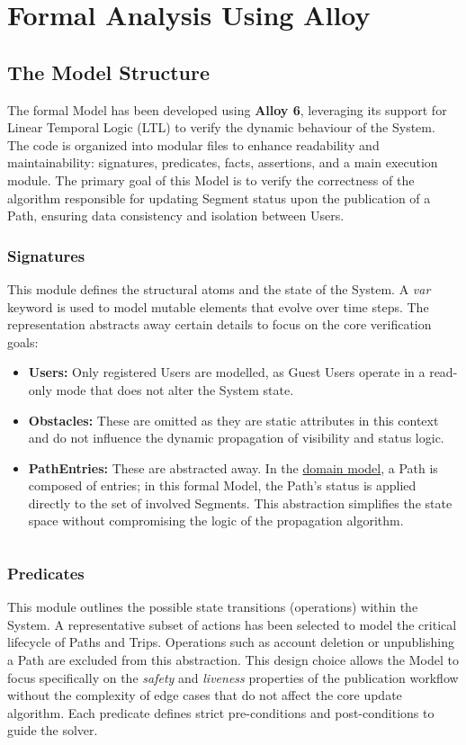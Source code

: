 \chapter{Formal Analysis Using Alloy}
\label{chap:alloy_analysis}

\section{The Model Structure}
The formal Model has been developed using \textbf{Alloy 6}, leveraging its support for Linear Temporal Logic (LTL) to verify the dynamic behaviour of the System. The code is organized into modular files to enhance readability and maintainability: signatures, predicates, facts, assertions, and a main execution module.
The primary goal of this Model is to verify the correctness of the algorithm responsible for updating Segment status upon the publication of a Path, ensuring data consistency and isolation between Users.

\subsection{Signatures}
This module defines the structural atoms and the state of the System. A \emph{var} keyword is used to model mutable elements that evolve over time steps.
The representation abstracts away certain details to focus on the core verification goals:
\begin{itemize}
    \item \textbf{Users:} Only registered Users are modelled, as Guest Users operate in a read-only mode that does not alter the System state.
    \item \textbf{Obstacles:} These are omitted as they are static attributes in this context and do not influence the dynamic propagation of visibility and status logic.
    \item \textbf{PathEntries:} These are abstracted away. In the \hyperref[section:domain_class_diagram]{domain model}, a Path is composed of entries; in this formal Model, the Path's status is applied directly to the set of involved Segments. This abstraction simplifies the state space without compromising the logic of the propagation algorithm.
\end{itemize}

\begin{code}
    \inputminted{alloy}{code/signatures.als}
\end{code}

\subsection{Predicates}
This module outlines the possible state transitions (operations) within the System. A representative subset of actions has been selected to model the critical lifecycle of Paths and Trips.
Operations such as account deletion or unpublishing a Path are excluded from this abstraction. This design choice allows the Model to focus specifically on the \emph{safety} and \emph{liveness} properties of the publication workflow without the complexity of edge cases that do not affect the core update algorithm.
Each predicate defines strict pre-conditions and post-conditions to guide the solver.

